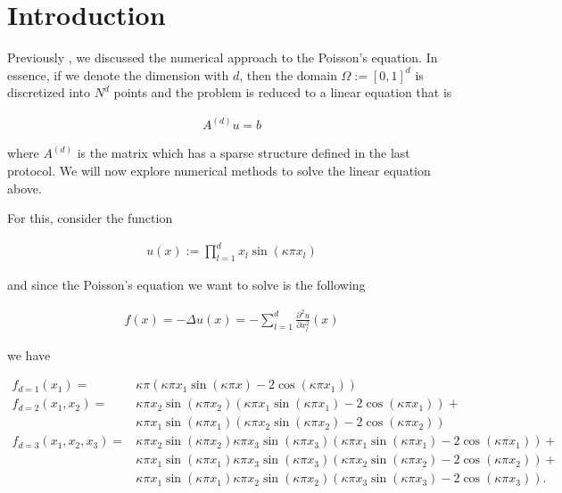\documentclass[refman]{article}
\theoremstyle{definition}
\begin{document}
\section{Introduction}

Previously \cite{xxx}, we discussed the numerical approach to the Poisson's equation. In essence, if we denote the dimension with \(d\), then the domain \(\Omega := [0, 1]^d\) is discretized into \(N^d\) points and the problem is reduced to a linear equation that is

\begin{align*}
	A^{(d)} u = b
\end{align*}

where \(A^{(d)}\) is the matrix which has a sparse structure defined in the last protocol. We will now explore numerical methods to solve the linear equation above.

For this, consider the function

\begin{align*}
	u(x) := \prod_{l=1}^d x_l \sin (\kappa \pi x_l)
\end{align*}

and since the Poisson's equation we want to solve is the following

\begin{align*}
	f(x) = - \Delta u(x) = -\sum_{l = 1}^d \frac{\partial^2 u}{\partial x_l^2} (x)
\end{align*}

we have

\begin{align*}
	f_{d=1} (x_1) =& \kappa \pi \left( \kappa \pi x_1 \sin ( \kappa \pi x ) - 2 \cos( \kappa \pi x_1) \right) \\
%	
	f_{d=2} (x_1, x_2) =& \kappa \pi x_2 \sin( \kappa \pi x_2) \left(  \kappa \pi x_1 \sin(\kappa \pi x_1) - 2 \cos ( \kappa \pi x_1) \right) + \\ 
	& \kappa \pi x_1 \sin( \kappa \pi x_1) \left(  \kappa \pi x_2 \sin(\kappa \pi x_2) - 2 \cos ( \kappa \pi x_2) \right) \\
%
	f_{d=3} (x_1, x_2, x_3) =& \kappa \pi x_2 \sin( \kappa \pi x_2) \kappa \pi x_3 \sin(\kappa \pi x_3)  \left(  \kappa \pi x_1 \sin(\kappa \pi x_1) - 2 \cos ( \kappa \pi x_1) \right) + \\
	& \kappa \pi x_1 \sin( \kappa \pi x_1) \kappa \pi x_3 \sin(\kappa \pi x_3)  \left(  \kappa \pi x_2 \sin(\kappa \pi x_2) - 2 \cos ( \kappa \pi x_2) \right) + \\
	& \kappa \pi x_1 \sin( \kappa \pi x_1) \kappa \pi x_2 \sin(\kappa \pi x_2)  \left(  \kappa \pi x_3 \sin(\kappa \pi x_3) - 2 \cos ( \kappa \pi x_3) \right) \text{.}
\end{align*}
\end{document}

